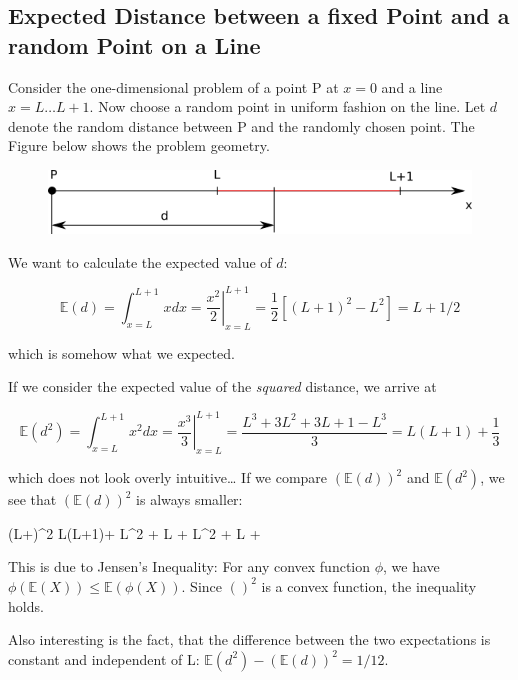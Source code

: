 
\subsection{Expected Distance between a fixed Point and a random Point on a Line}

Consider the one-dimensional problem of a point P at \(x=0\) and a line
\(x=L \ldots L+1\). Now choose a random point in uniform fashion on the
line. Let \(d\) denote the random distance between P and the randomly
chosen point. The Figure below shows the problem geometry.

\begin{figure}[H]
\centering
\includegraphics[scale=0.7]{images/expected_distances_01_01.png}
\end{figure}

We want to calculate the expected value of \(d\):

\[
\mathbb{E}(d) = \int_{x=L}^{L+1} x dx = \left. \frac{x^2}{2} \right|_{x=L}^{L+1} = \frac{1}{2} \left[ (L+1)^2 - L^2 \right] = L + 1/2
\]

which is somehow what we expected.

If we consider the expected value of the \emph{squared} distance, we
arrive at

\[
\mathbb{E}(d^2) = \int_{x=L}^{L+1} x^2 dx = \left. \frac{x^3}{3} \right|_{x=L}^{L+1} = \frac{L^3 + 3L^2 + 3L + 1 - L^3}{3} = L(L+1) + \frac{1}{3}
\]

which does not look overly intuitive\ldots{} If we compare
\((\mathbb{E}(d))^2\) and \(\mathbb{E}(d^2)\), we see that
\((\mathbb{E}(d))^2\) is always smaller:

\bee
(L+)^2 \leq L(L+1)+ \rightarrow L^2 + L +  \leq L^2 + L +  \rightarrow {} \leq {}
\eee

This is due to Jensen's Inequality: For any convex function \(\phi\), we
have \(\phi(\mathbb{E}(X)) \leq \mathbb{E}(\phi(X))\). Since \(()^2\) is
a convex function, the inequality holds.

Also interesting is the fact, that the difference between the two
expectations is constant and independent of L:
\(\mathbb{E}(d^2) - (\mathbb{E}(d))^2 = 1/12\).

